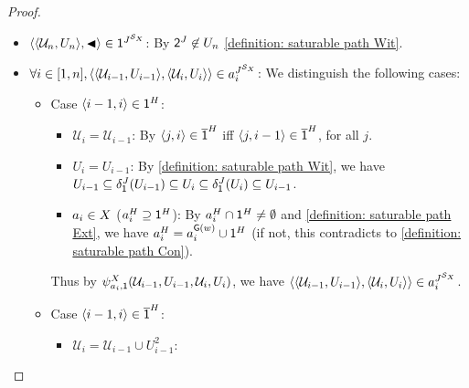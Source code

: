 \begin{proof}
\begin{itemize}
                    By $\src^{\graph[3]} \in U_0$ \ref{definition: saturable path Wit} and $\mathcal{U}_0 = \emptyset$.
              \item $\tuple{\tuple{\mathcal{U}_n, U_n}, \blacktriangleleft} \in \id^{\graph[3]^{\FillS_{\Aset}}}$:
                    By $\tgt^{\graph[3]} \not\in U_{n}$ \ref{definition: saturable path Wit}.
              \item $\forall i \in \range{1, n}, \tuple{\tuple{\mathcal{U}_{i-1}, U_{i-1}}, \tuple{\mathcal{U}_{i}, U_{i}}} \in a_{i}^{\graph[3]^{\FillS_{\Aset}}}$:
                    We distinguish the following cases:
                    \begin{itemize}
                           \item Case $\tuple{i-1, i} \in \id^{\graph[2]}$:
                                   \begin{itemize}
                                          \item  $\mathcal{U}_{i} = \mathcal{U}_{i-1}$:
                                          By $\tuple{j, i} \in \com{\id}^{\graph[2]}$ iff $\tuple{j, i-1} \in \com{\id}^{\graph[2]}$, for all $j$.
                                          \item $U_{i} = U_{i-1}$:
                                          By \ref{definition: saturable path Wit}, we have $U_{i-1} \subseteq \delta_{\id}^{\graph[3]}(U_{i-1}) \subseteq U_{i} \subseteq \delta_{\id}^{\graph[3]}(U_{i}) \subseteq U_{i-1}$.
                                          \item $a_{i} \in X$ ($a_{i}^{\graph[2]} \supseteq \id^{\graph[2]}$):
                                          By $a_{i}^{\graph[2]} \cap \id^{\graph[2]} \neq \emptyset$ and \ref{definition: saturable path Ext},
                                          we have $a_{i}^{\graph[2]} = a_{i}^{\const{\graph}(\word)} \cup \id^{\graph[2]}$ (if not, this contradicts to \ref{definition: saturable path Con}).
                                   \end{itemize}
                                 Thus by $\fml[2]_{a_{i}, \id}^{\Aset}(\mathcal{U}_{i-1}, U_{i-1}, \mathcal{U}_{i}, U_{i})$, we have $\tuple{\tuple{\mathcal{U}_{i-1}, U_{i-1}}, \tuple{\mathcal{U}_{i}, U_{i}}} \in a_{i}^{\graph[3]^{\FillS_{\Aset}}}$.
                           \item Case $\tuple{i-1, i} \in \com{\id}^{\graph[2]}$:
                           \begin{itemize}
                                   \item $\mathcal{U}_{i} = \mathcal{U}_{i-1} \cup U_{i-1}^2$:

\end{itemize}
\end{itemize}
\end{itemize}
\end{proof}
